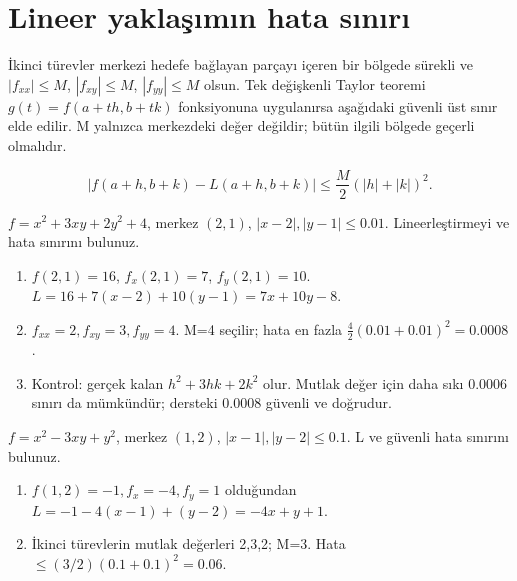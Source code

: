 \section{Lineer yaklaşımın hata sınırı}
İkinci türevler merkezi hedefe bağlayan parçayı içeren bir bölgede sürekli ve \(|f_{xx}|\le M\), \(|f_{xy}|\le M\), \(|f_{yy}|\le M\) olsun. Tek değişkenli Taylor teoremi \(g(t)=f(a+th,b+tk)\) fonksiyonuna uygulanırsa aşağıdaki güvenli üst sınır elde edilir. M yalnızca merkezdeki değer değildir; bütün ilgili bölgede geçerli olmalıdır.


{\small\[
|f(a+h,b+k)-L(a+h,b+k)|\le\frac M2(|h|+|k|)^2.
\]}
\begin{tcolorbox}[title={Örnek 5.8 | Defterdeki hata sınırı},colframe=accent]\(f=x^2+3xy+2y^2+4\), merkez \((2,1)\), \(|x-2|,|y-1|\le0.01\). Lineerleştirmeyi ve hata sınırını bulunuz.
\par{}\end{tcolorbox}
\begin{tcolorbox}[title={Adım adım çözüm},colback=green!3!white,colframe=green]\begin{enumerate}
\item \(f(2,1)=16\), \(f_x(2,1)=7\), \(f_y(2,1)=10\). \(L=16+7(x-2)+10(y-1)=7x+10y-8\).
\item \(f_{xx}=2,f_{xy}=3,f_{yy}=4\). M=4 seçilir; hata en fazla \(\tfrac42(0.01+0.01)^2=0.0008\).
\item Kontrol: gerçek kalan \(h^2+3hk+2k^2\) olur. Mutlak değer için daha sıkı \(0.0006\) sınırı da mümkündür; dersteki \(0.0008\) güvenli ve doğrudur.
\end{enumerate}\end{tcolorbox}
\begin{tcolorbox}[title={Örnek 5.9 | İkinci hata sınırı sorusu},colframe=accent]\(f=x^2-3xy+y^2\), merkez \((1,2)\), \(|x-1|,|y-2|\le0.1\). L ve güvenli hata sınırını bulunuz.
\par{}\end{tcolorbox}
\begin{tcolorbox}[title={Adım adım çözüm},colback=green!3!white,colframe=green]\begin{enumerate}
\item \(f(1,2)=-1,f_x=-4,f_y=1\) olduğundan \(L=-1-4(x-1)+(y-2)=-4x+y+1\).
\item İkinci türevlerin mutlak değerleri 2,3,2; M=3. Hata \(\le(3/2)(0.1+0.1)^2=0.06\).
\end{enumerate}\end{tcolorbox}
